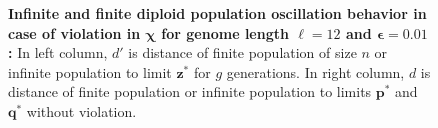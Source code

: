 \begin{figure}[h]
\begin{center}
\hspace{-3em}%
\vspace{-0.5em}  \hspace{-3em}%


\caption[\textbf{Infinite and finite diploid population oscillation behavior in case of violation in $\bm{\chi}$ for genome length $\ell = 12$ and $\bm{\epsilon} = 0.01$}]{\textbf{Infinite and finite diploid population oscillation behavior in case of violation in $\bm{\chi}$ for genome length $\ell = 12$ and $\bm{\epsilon} = 0.01$:} 
  In left column, $d'$ is distance of finite population of size $n$ or infinite population to limit $\bm{z}^\ast$ for $g$ generations. In right column, $d$ is distance of finite population or infinite population to limits $\bm{p}^\ast$ and $\bm{q}^\ast$ without violation.}
\label{oscillation_12d_vio_chi_0.01}
\end{center}
\end{figure}

